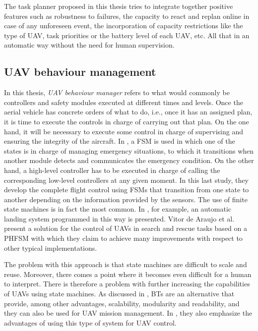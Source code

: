 The task planner proposed in this thesis tries to integrate together positive features such as robustness to failures, the capacity to react and replan online in case of any unforeseen event, the incorporation of capacity restrictions like the type of \gls{UAV}, task priorities or the battery level of each \gls{UAV}, etc. All that in an automatic way without the need for human supervision.

\subsection{\gls{UAV} behaviour management}
\label{subsec:DroneBehaviorManagement}
In this thesis, \emph{\gls{UAV} behaviour manager} refers to what would commonly be controllers and safety modules executed at different times and levels. Once the aerial vehicle has concrete orders of what to do, i.e., once it has an assigned plan, it is time to execute the controls in charge of carrying out that plan. On the one hand, it will be necessary to execute some control in charge of supervising and ensuring the integrity of the aircraft. In \cite{monterrosa2016design}, a \gls{FSM} is used in which one of the states is in charge of managing emergency situations, to which it transitions when another module detects and communicates the emergency condition. On the other hand, a high-level controller has to be executed in charge of calling the corresponding low-level controllers at any given moment. In this last study, they develop the complete flight control using \glspl{FSM} that transition from one state to another depending on the information provided by the sensors. The use of finite state machines is in fact the most common. In \cite{kugler2017autoland}, for example, an automatic landing system programmed in this way is presented. Vitor de Araujo et al. \cite{de2014parallel} present a solution for the control of UAVs in search and rescue tasks based on a \gls{PHFSM} with which they claim to achieve many improvements with respect to other typical implementations.

The problem with this approach is that state machines are difficult to scale and reuse. Moreover, there comes a point where it becomes even difficult for a human to interpret. There is therefore a problem with further increasing the capabilities of \glspl{UAV} using state machines. As discussed in \cite{klockner2013behavior}, \glspl{BT} are an alternative that provide, among other advantages, scalability, modularity and readability, and they can also be used for \gls{UAV} mission management. In \cite{ogren2012increasing}, they also emphasize the advantages of using this type of system for \gls{UAV} control.

